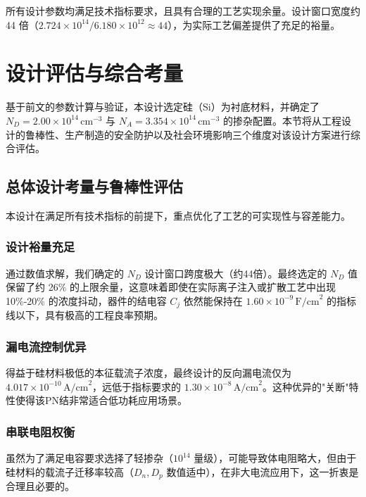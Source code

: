 \documentclass[12pt,a4paper]{article}
\begin{document}
\vspace{1em}

所有设计参数均满足技术指标要求，且具有合理的工艺实现余量。设计窗口宽度约 44 倍（$2.724 \times 10^{14} / 6.180 \times 10^{12} \approx 44$），为实际工艺偏差提供了充足的裕量。

\clearpage
\section{设计评估与综合考量}

基于前文的参数计算与验证，本设计选定硅（Si）为衬底材料，并确定了 $N_D=2.00\times10^{14}\,\text{cm}^{-3}$ 与 $N_A=3.354\times10^{14}\,\text{cm}^{-3}$ 的掺杂配置。本节将从工程设计的鲁棒性、生产制造的安全防护以及社会环境影响三个维度对该设计方案进行综合评估。

\subsection{总体设计考量与鲁棒性评估}

本设计在满足所有技术指标的前提下，重点优化了工艺的可实现性与容差能力。

\subsubsection{设计裕量充足}

通过数值求解，我们确定的 $N_D$ 设计窗口跨度极大（约44倍）。最终选定的 $N_D$ 值保留了约 26\% 的上限余量，这意味着即使在实际离子注入或扩散工艺中出现 10\%-20\% 的浓度抖动，器件的结电容 $C_j$ 依然能保持在 $1.60\times10^{-9}\,\text{F/cm}^2$ 的指标线以下，具有极高的工程良率预期。

\subsubsection{漏电流控制优异}

得益于硅材料极低的本征载流子浓度，最终设计的反向漏电流仅为 $4.017\times10^{-10}\,\text{A/cm}^2$，远低于指标要求的 $1.30\times10^{-8}\,\text{A/cm}^2$。这种优异的"关断"特性使得该PN结非常适合低功耗应用场景。

\subsubsection{串联电阻权衡}

虽然为了满足电容要求选择了轻掺杂（$10^{14}$ 量级），可能导致体电阻略大，但由于硅材料的载流子迁移率较高（$D_n, D_p$ 数值适中），在非大电流应用下，这一折衷是合理且必要的。
\end{document}
